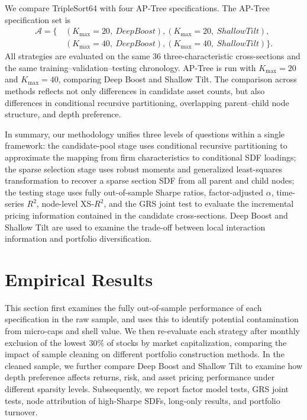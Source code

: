 \documentclass[12pt]{article}
\def\text#1{#1}%
\begin{document}
We compare TripleSort64 with four AP-Tree specifications. The AP-Tree specification set is
\begin{equation}
  \begin{aligned}
  \mathcal A
  =\{\,&(K_{\max}=20,\ \text{Deep Boost}),
         (K_{\max}=20,\ \text{Shallow Tilt}),\\
       &(K_{\max}=40,\ \text{Deep Boost}),
         (K_{\max}=40,\ \text{Shallow Tilt})\}.
  \end{aligned}
  \label{eq:ap_tree_strategy_set}
\end{equation}
All strategies are evaluated on the same 36 three-characteristic cross-sections and the same training–validation–testing chronology. AP-Tree is run with \(K_{\max}=20\) and \(K_{\max}=40\), comparing Deep Boost and Shallow Tilt. The comparison across methods reflects not only differences in candidate asset counts, but also differences in conditional recursive partitioning, overlapping parent–child node structure, and depth preference.

In summary, our methodology unifies three levels of questions within a single framework: the candidate-pool stage uses conditional recursive partitioning to approximate the mapping from firm characteristics to conditional SDF loadings; the sparse selection stage uses robust moments and generalized least-squares transformation to recover a sparse section SDF from all parent and child nodes; the testing stage uses fully out-of-sample Sharpe ratios, factor-adjusted \(\alpha\), time-series \(R^2\), node-level XS-\(R^2\), and the GRS joint test to evaluate the incremental pricing information contained in the candidate cross-sections. Deep Boost and Shallow Tilt are used to examine the trade-off between local interaction information and portfolio diversification.

\clearpage

\section{Empirical Results}
\label{sec:empirical_results}

This section first examines the fully out-of-sample performance of each specification in the raw sample, and uses this to identify potential contamination from micro-caps and shell value. We then re-evaluate each strategy after monthly exclusion of the lowest \(30\%\) of stocks by market capitalization, comparing the impact of sample cleaning on different portfolio construction methods. In the cleaned sample, we further compare Deep Boost and Shallow Tilt to examine how depth preference affects returns, risk, and asset pricing performance under different sparsity levels. Subsequently, we report factor model tests, GRS joint tests, node attribution of high-Sharpe SDFs, long-only results, and portfolio turnover.
\end{document}
